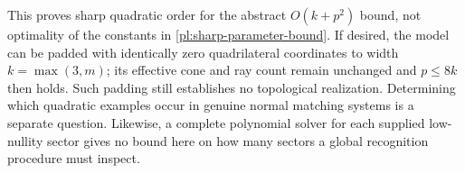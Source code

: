 This proves sharp quadratic order for the abstract \(O(k+p^2)\)
bound, not optimality of the constants in
\eqref{pl:sharp-parameter-bound}.
If desired, the model can be padded with identically zero
quadrilateral coordinates to width \(k=\max(3,m)\); its effective
cone and ray count remain unchanged and \(p\leq8k\) then holds.
Such padding still establishes no topological realization.
Determining which quadratic examples occur in genuine normal
matching systems is a separate question.  Likewise, a complete
polynomial solver for each supplied low-nullity sector gives no
bound here on how many sectors a global recognition procedure
must inspect.
